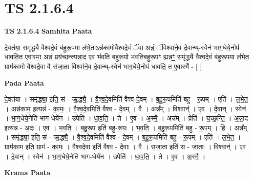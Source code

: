 \documentclass[17pt]{extarticle}
\begin{document}
\section*{ TS 2.1.6.4 }

\textbf{TS 2.1.6.4 } \newline
\textbf{Samhita Paata} \newline

दे॒वत॑या॒ समृ॑द्ध्यै वैश्वदे॒वं ब॑हुरू॒पमा ल॑भे॒ताऽन्न॑कामोवैश्वदे॒वं ॅवा अन्नं॒ ॅविश्वा॑ने॒व दे॒वान्थ्-स्वेन॑ भाग॒धेये॒नोप॑ धावति॒त ए॒वास्मा॒ अन्नं॒ प्रय॑च्छन्त्यन्ना॒द ए॒व भ॑वति बहुरू॒पो भ॑वतिबहुरू॒पꣳ ह्यन्नꣳ॒॒ समृ॑द्ध्यै वैश्वदे॒वं ब॑हुरू॒पमा ल॑भेत॒ ग्राम॑कामो वैश्वदे॒वा वै स॑जा॒ता विश्वा॑ने॒व दे॒वान्थ्-स्वेन॑ भाग॒धेये॒नोप॑ धावति॒ त ए॒वास्मै॑ - [  ] \newline

\textbf{Pada Paata} \newline

दे॒वत॑या । समृ॑द्ध्या॒ इति॒ सं - ऋ॒द्ध्यै॒ । वै॒श्व॒दे॒वमिति॑ वैश्व-दे॒वम् । ब॒हु॒रू॒पमिति॑ बहु - रू॒पम् । एति॑ । ल॒भे॒त॒ । अन्न॑काम॒ इत्यन्न॑ - का॒मः॒ । वै॒श्व॒दे॒वमिति॑ वैश्व - दे॒वम् । वै । अन्न᳚म् । विश्वान्॑ । ए॒व । दे॒वान् । स्वेन॑ । भा॒ग॒धेये॒नेति॑ भाग-धेये॑न । उपेति॑ । धा॒व॒ति॒ । ते । ए॒व । अ॒स्मै॒ । अन्न᳚म् । प्रेति॑ । य॒च्छ॒न्ति॒ । अ॒न्ना॒द इत्य॑न्न - अ॒दः । ए॒व । भ॒व॒ति॒ । ब॒हु॒रू॒प इति॑ बहु-रू॒पः । भ॒व॒ति॒ । ब॒हु॒रू॒पमिति॑ बहु - रू॒पम् । हि । अन्न᳚म् । समृ॑द्ध्या॒ इति॒ सं - ऋ॒द्ध्यै॒ । वै॒श्व॒दे॒वमिति॑ वैश्व - दे॒वम् । ब॒हु॒रू॒पमिति॑ बहु - रू॒पम् । एति॑ । ल॒भे॒त॒ । ग्राम॑काम॒ इति॒ ग्राम॑ - का॒मः॒ । वै॒श्व॒दे॒वा इति॑ वैश्व - दे॒वाः । वै । स॒जा॒ता इति॑ स - जा॒ताः । विश्वान्॑ । ए॒व । दे॒वान् । स्वेन॑ । भा॒ग॒धेये॒नेति॑ भाग-धेये॑न । उपेति॑ । धा॒व॒ति॒ । ते । ए॒व । अ॒स्मै॒ ।  \newline


\textbf{Krama Paata} \newline
\end{document}
